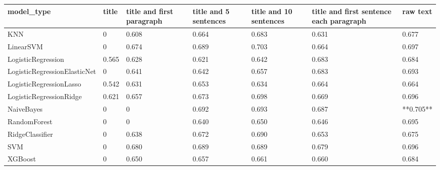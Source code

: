 \begin{tabular}{lllllll}
\toprule
                  model\_type & title & title and first paragraph & title and 5 sentences & title and 10 sentences & title and first sentence each paragraph &  raw text \\
\midrule
                         KNN &     0 &                     0.608 &                 0.664 &                  0.683 &                                   0.631 &     0.677 \\
                   LinearSVM &     0 &                     0.674 &                 0.689 &                  0.703 &                                   0.664 &     0.697 \\
          LogisticRegression & 0.565 &                     0.628 &                 0.621 &                  0.642 &                                   0.683 &     0.684 \\
LogisticRegressionElasticNet &     0 &                     0.641 &                 0.642 &                  0.657 &                                   0.683 &     0.693 \\
     LogisticRegressionLasso & 0.542 &                     0.631 &                 0.653 &                  0.634 &                                   0.664 &     0.664 \\
     LogisticRegressionRidge & 0.621 &                     0.657 &                 0.673 &                  0.698 &                                   0.669 &     0.696 \\
                  NaiveBayes &     0 &                         0 &                 0.692 &                  0.693 &                                   0.687 & **0.705** \\
                RandomForest &     0 &                         0 &                 0.640 &                  0.650 &                                   0.646 &     0.695 \\
             RidgeClassifier &     0 &                     0.638 &                 0.672 &                  0.690 &                                   0.653 &     0.675 \\
                         SVM &     0 &                     0.680 &                 0.689 &                  0.689 &                                   0.679 &     0.696 \\
                     XGBoost &     0 &                     0.650 &                 0.657 &                  0.661 &                                   0.660 &     0.684 \\
\bottomrule
\end{tabular}
